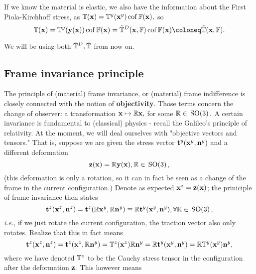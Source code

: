 \documentclass[11pt]{scrartcl} %
\begin{document}
\begin{remark}
	If we know the material is elastic, we also have the information about the First Piola-Kirchhoff stress, as $\mathbb{T}\qty(\vb{x}) = \mathbb{T}^y\qty(\vb{x}^{y})\operatorname{cof} \mathbb{F}\qty(\vb{x}),$ so
	\begin{equation}
		\label{eq:response_undeformed}
		\pkstress\qty(\vb{x}) =\cstress\qty(\vb{y}\qty(\vb{x}))\cof \fgrad\qty(\vb{x}) =  \tilde{\tensorq{T}}^D\qty(\vb{x}, \fgrad) \cof \fgrad\qty(\vb{x}) \coloneq \tilde{\tensorq{T}}\qty(\vb{x},\fgrad).
	\end{equation}
\end{remark}
We will be using both $\tilde{\mathbb{T}}^D, \tilde{\mathbb{T}}$ from now on.

\subsection{Frame invariance principle}
\label{sec:frame_invariance}
The principle of (material) frame invariance, or (material) frame indifference is closely connected with the notion of \textbf{objectivity}. Those terms concern the change of observer: a transformation $\vb{x} \mapsto \mathbb{R}\vb{x},$ for some $\mathbb{R} \in \, \text{SO(3)} \,.$ A certain invariance is fundamental to (classical) physics - recall the Galileo's principle of relativity. 
At the moment, we will deal ourselves with "objective vectors and tensors." That is, suppose we are given the stress vector $\vb{t}^{y}\qty(\vb{x}^{y}, \vb{n}^{y})$ and a different deformation
\[
	\vb{z}\qty(\vb{x}) = \mathbb{R} \vb{y}\qty(\vb{x}), \mathbb{R} \in \, \text{SO(3)} \,,
\]
(this deformation is only a rotation, so it can in fact be seen as a change of the frame in the current configuration.) Denote as expected $\vb{x}^z = \vb{z}(\vb{x})$; the priniciple of frame invariance then states
\[
	\vb{t}^z\qty(\vb{x}^z, \vb{n}^z) = \vb{t}^z\qty(\mathbb{R}\vb{x}^{y}, \mathbb{R}\vb{n}^{y}) \equiv \mathbb{R}\vb{t}^{y}\qty(\vb{x}^{y}, \vb{n}^{y}), \forall \mathbb{R} \in \, \text{SO(3)} \,,
\]
\textit{i.e.}, if we just rotate the current configuration, the traction vector also only rotates.
Realize that this in fact means
\[
	\vb{t}^z\qty(\vb{x}^z, \vb{n}^z) = \vb{t}^z\qty(\vb{x}^z, \mathbb{R}\vb{n}^y) = \mathbb{T}^z\qty(\vb{x}^z) \mathbb{R}\vb{n}^{y} = \mathbb{R}\vb{t}^{y}\qty(\vb{x}^{y}, \vb{n}^{y}) = \mathbb{R}\mathbb{T}^y\qty(\vb{x}^{y}) \vb{n}^{y},
\]
where we have denoted $\mathbb{T}^z$ to be the Cauchy stress tensor in the configuration after the deformation $\vb{z}.$ This however means
\end{document}
